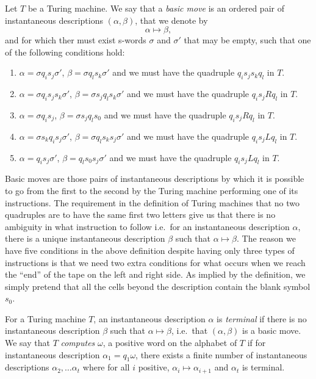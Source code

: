 \begin{definition}
  Let $T$ be a Turing machine. We say that a \emph{basic move} is an ordered pair of instantaneous descriptions $(\alpha,\beta)$, that we denote by
  \begin{equation*}
    \alpha \mapsto \beta,
  \end{equation*}
  and for which ther must exist s-words $\sigma$ and $\sigma'$ that may be empty, such that one of the following conditions hold:
  \begin{enumerate}
  \item $\alpha = \sigma q_i s_j\sigma'$, $\beta = \sigma q_l s_k \sigma'$ and we must have the quadruple $q_is_js_kq_l$ in $T$.
  \item $\alpha = \sigma q_i s_j s_k \sigma'$, $\beta = \sigma s_j q_l s_k \sigma'$ and we must have the quadruple $q_is_jRq_l$ in $T$.
  \item $\alpha = \sigma q_i s_j$, $\beta = \sigma s_j q_l s_0$ and we must have the quadruple $q_is_jRq_l$ in $T$.
  \item $\alpha = \sigma s_k q_i s_j \sigma'$, $\beta = \sigma q_l s_k s_j \sigma'$ and we must have the quadruple $q_is_jLq_l$ in $T$.
  \item $\alpha = q_i s_j \sigma'$, $\beta =  q_l s_0 s_j \sigma'$ and we must have the quadruple $q_is_jLq_l$ in $T$.
  \end{enumerate}
\end{definition}

Basic moves are those pairs of instantaneous descriptions by which it is possible to go from the first to the second by the Turing machine performing one of its instructions. The requirement in the definition of Turing machines that no two quadruples are to have the same first two letters give us that there is no ambiguity in what instruction to follow i.e.\ for an instantaneous description $\alpha$, there is a unique instantaneous description $\beta$ such that $\alpha \mapsto \beta$. The reason we have five conditions in the above definition despite having only three types of instructions is that we need two extra conditions for what occurs when we reach the ``end'' of the tape on the left and right side. As implied by the definition, we simply pretend that all the cells beyond the description contain the blank symbol $s_0$.

\begin{definition}
For a Turing machine $T$, an instantaneous description $\alpha$ is \emph{terminal} if there is no instantaneous description $\beta$ such that $\alpha \mapsto \beta$, i.e.\ that $(\alpha,\beta)$ is a basic move. We say that $T$ \emph{computes} $\omega$, a positive word on the alphabet of $T$ if for instantaneous description $\alpha_1 = q_1\omega$, there exists a finite number of instantaneous descriptions $\alpha_2,\dots \alpha_t$ where for all $i$ positive, $\alpha_i \mapsto \alpha_{i+1}$ and $\alpha_t$ is terminal.
\end{definition}

